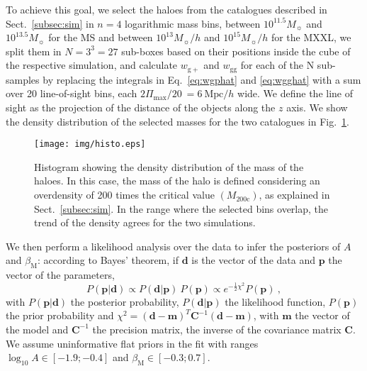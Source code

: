 \documentclass[a4paper,fleqn,usenatbib]{mnras}
\begin{document}
To achieve this goal, we select the haloes from the catalogues described in Sect.~\ref{subsec:sim} in $n = 4$ logarithmic mass bins, between $10^{11.5} M_{\sun}$ and $10^{13.5} M_{\sun}$ for the MS and between $10^{13} M_{\sun}/h$ and $10^{15} M_{\sun}/h$ for the MXXL, we split them in $N = 3^3 = 27$ sub-boxes based on their positions inside the cube of the respective simulation, and calculate $w_{\mathrm{g+}}$ and $w_{\mathrm{gg}}$ for each of the N sub-samples by replacing the integrals in Eq.~\ref{eq:wgphat} and \ref{eq:wgghat} with a sum over 20 line-of-sight bins, each $2\Pi_{\mathrm{max}}/ 20 \ = 6 \ \mbox{Mpc}/h$ wide. We define the line of sight as the projection of the distance of the objects along the $z$ axis. We show the density distribution of the selected masses for the two catalogues in Fig.~\ref{fig:histo}.
\begin{figure}
	\centerline{
	\texttt{[image: img/histo.eps]}}
	\caption{Histogram showing the density distribution of the mass of the haloes.
	In this case, the mass of the halo is defined considering an overdensity of 200 times the critical value $(M_{200\mathrm{c}})$, as explained in Sect.~\ref{subsec:sim}. In the range where the selected bins overlap, the trend of the density agrees for the two simulations.}
	\label{fig:histo}
\end{figure}

We then perform a likelihood analysis over the data to infer the posteriors of $A$ and $\beta_{\mathrm{M}}$: according to Bayes' theorem, if $\boldsymbol{d}$ is the vector of the data and $\boldsymbol{p}$ the vector of the parameters, 
\begin{equation}
    P(\boldsymbol{p} | \boldsymbol{d}) \propto P(\boldsymbol{d} | \boldsymbol{p}) \ P(\boldsymbol{p}) \propto e^{-\frac{1}{2} \chi ^2} P(\boldsymbol{p}) \ ,
	\label{eq:bayes}
\end{equation}
with $P(\boldsymbol{p} | \boldsymbol{d})$ the posterior probability, $P(\boldsymbol{d} | \boldsymbol{p})$ the likelihood function, $P(\boldsymbol{p})$ the prior probability and $\chi ^2 = (\boldsymbol{d} - \boldsymbol{m})^T \mathbf{C}^{-1} (\boldsymbol{d} - \boldsymbol{m})$, with $\boldsymbol{m}$ the vector of the model and $\mathbf{C}^{-1}$ the precision matrix, the inverse of the covariance matrix $\mathbf{C}$. We assume uninformative flat priors in the fit with ranges $\log_{10} A \in [-1.9;-0.4]$ and $\beta_{\mathrm{M}} \in [-0.3;0.7]$. 
\end{document}
